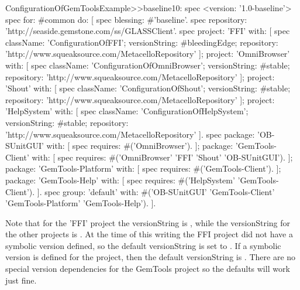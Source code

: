 \documentclass[a4paper,10pt,twoside]{book}
\begin{document}
\begin{code}{}
ConfigurationOfGemToolsExample>>baseline10: spec
  <version: '1.0-baseline'>
  spec for: #common do: [
     spec blessing: #'baseline'.
     spec repository: 'http://seaside.gemstone.com/ss/GLASSClient'.
     spec
        project: 'FFI' with: [
          spec
             className: 'ConfigurationOfFFI';
             versionString: #bleedingEdge;
             repository: 'http://www.squeaksource.com/MetacelloRepository' ];
        project: 'OmniBrowser' with: [
          spec
             className: 'ConfigurationOfOmniBrowser';
             versionString: #stable;
             repository: 'http://www.squeaksource.com/MetacelloRepository' ];
        project: 'Shout' with: [
          spec
             className: 'ConfigurationOfShout';
             versionString: #stable;
             repository: 'http://www.squeaksource.com/MetacelloRepository' ];
        project: 'HelpSystem' with: [
          spec
             className: 'ConfigurationOfHelpSystem';
             versionString: #stable;
             repository: 'http://www.squeaksource.com/MetacelloRepository' ].
     spec
        package: 'OB-SUnitGUI' with: [
          spec requires: #('OmniBrowser'). ];
        package: 'GemTools-Client' with: [
          spec requires: #('OmniBrowser' 'FFI' 'Shout' 'OB-SUnitGUI'). ];
        package: 'GemTools-Platform' with: [
          spec requires: #('GemTools-Client'). ];
        package: 'GemTools-Help' with: [
          spec requires: #('HelpSystem' 'GemTools-Client'). ].
     spec group: 'default' with: #('OB-SUnitGUI' 'GemTools-Client'
             'GemTools-Platform' 'GemTools-Help'). ].
\end{code}             



Note that for the 'FFI' project the versionString is , while the versionString for the other projects is . At the time of this writing the FFI project did not have a  symbolic version defined, so the default versionString is set to . If a  symbolic version is defined for the project, then the default versionString is . There are no special version dependencies for the GemTools project so the defaults will work just fine. 

\end{document}

